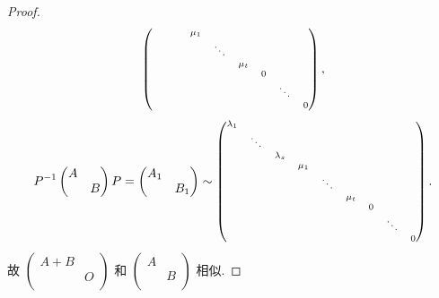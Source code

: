\documentclass[../../main.tex]{subfiles}
\begin{document}
\begin{proof}
\begin{align*}
\begin{scriptsize}
\begin{pmatrix}
&		&		&		\mu _1&		&		&		&		&		\\
&		&		&		&		\ddots&		&		&		&		\\
&		&		&		&		&		\mu _t&		&		&		\\
&		&		&		&		&		&		0&		&		\\
&		&		&		&		&		&		&		\ddots&		\\
&		&		&		&		&		&		&		&		0\\
\end{pmatrix}\end{scriptsize},
\end{align*}
\begin{align*}
P^{-1}\begin{pmatrix}
A&		\\
&		B\\
\end{pmatrix} P=\begin{pmatrix}
A_1&		\\
&		B_1\\
\end{pmatrix} \sim \begin{scriptsize}\begin{pmatrix}
\lambda _1&		&		&		&		&		&		&		&		\\
&		\ddots&		&		&		&		&		&		&		\\
&		&		\lambda _s&		&		&		&		&		&		\\
&		&		&		\mu _1&		&		&		&		&		\\
&		&		&		&		\ddots&		&		&		&		\\
&		&		&		&		&		\mu _t&		&		&		\\
&		&		&		&		&		&		0&		&		\\
&		&		&		&		&		&		&		\ddots&		\\
&		&		&		&		&		&		&		&		0\\
\end{pmatrix}\end{scriptsize}.
\end{align*}
故 $\begin{pmatrix}
A+B&		\\
&		O\\
\end{pmatrix}$ 和 $\begin{pmatrix}
A&		\\
&		B\\
\end{pmatrix}$ 相似.
\end{proof}
\end{document}

